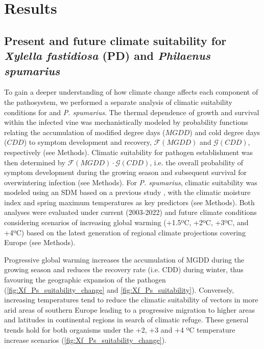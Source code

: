 \section{Results}

\subsection{Present and future climate suitability for \textit{Xylella
        fastidiosa} (PD) and \textit{Philaenus spumarius}}

To gain a deeper understanding of how climate change affects each component
of the pathosystem, we performed a separate analysis of climatic suitability
conditions for \xf{} and \textit{P. spumarius}. The thermal dependence of \xf{}
growth and survival within the infected vine was mechanistically modeled by
probability functions relating the accumulation of modified degree days
($MGDD$) and cold degree days ($CDD$) to symptom development and recovery,
$\mathcal{F}(MGDD)$ and $\mathcal{G}(CDD)$, respectively (see Methods).
Climatic suitability for pathogen establishment was then determined by
$\mathcal{F}(MGDD)\cdot\mathcal{G}(CDD)$, i.e. the overall probability of
symptom development during the growing season and subsequent survival for
overwintering infection (see Methods).	For \textit{P. spumarius}, climatic
suitability was modeled using an SDM based on a previous study
\cite{Godefroid2022_vector}, with the climatic moisture index
\cite{willmott_more_1992} and spring maximum temperatures  as key predictors
(see Methods). Both analyses were evaluated under current (2003-2022) and
future climate conditions considering scenarios of increasing global warming
(+1.5ºC, +2ºC, +3ºC, and +4ºC) based on the latest generation of regional
climate projections covering Europe \cite{jacob_regional_2020} (see Methods).

Progressive global warming increases the accumulation of MGDD during the
growing season and reduces the recovery rate (i.e. CDD) during winter, thus
favouring the geographic expansion of the pathogen
(\cref{fig:Xf_Ps_suitability_change} and \cref{fig:Xf_Ps_suitability}).
Conversely, increasing temperatures tend to reduce the climatic suitability of
vectors in more arid areas of southern Europe leading to a progressive
migration to higher areas and latitudes in continental regions in search of
climatic refuge. These general trends hold for both organisms under the +2, +3
and +4 ºC temperature increase scenarios
(\cref{fig:Xf_Ps_suitability_change}).


